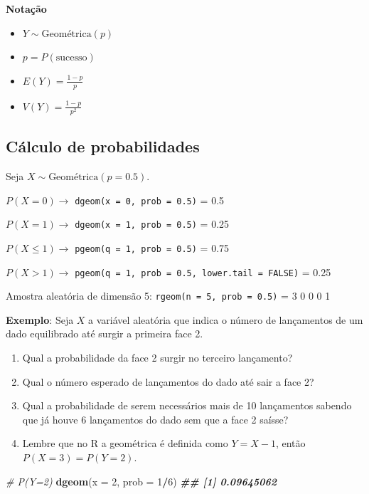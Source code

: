 \documentclass[
]{book}
\newenvironment{Shaded}{\begin{snugshade}}{\end{snugshade}}
\newcommand{\AttributeTok}[1]{\textcolor[rgb]{0.13,0.29,0.53}{#1}}
\newcommand{\CommentTok}[1]{\textcolor[rgb]{0.56,0.35,0.01}{\textit{#1}}}
\newcommand{\DecValTok}[1]{\textcolor[rgb]{0.00,0.00,0.81}{#1}}
\newcommand{\DocumentationTok}[1]{\textcolor[rgb]{0.56,0.35,0.01}{\textbf{\textit{#1}}}}
\newcommand{\FunctionTok}[1]{\textcolor[rgb]{0.13,0.29,0.53}{\textbf{#1}}}
\newcommand{\NormalTok}[1]{#1}
\newcommand{\SpecialCharTok}[1]{\textcolor[rgb]{0.81,0.36,0.00}{\textbf{#1}}}
\providecommand{\tightlist}{%
  \setlength{\itemsep}{0pt}\setlength{\parskip}{0pt}}
\begin{document}
\textbf{Notação}

\begin{itemize}
\tightlist
\item
  \(Y \sim \text{Geométrica}(p)\)
\item
  \(p = P(\text{sucesso})\)
\item
  \(E(Y) = \frac{1-p}{p}\)
\item
  \(V(Y) = \frac{1-p}{p^2}\)
\end{itemize}

\subsection{Cálculo de probabilidades}\label{cuxe1lculo-de-probabilidades-2}

Seja \(X\sim \text{Geométrica}(p=0.5)\).

\(P(X=0) \to\) \texttt{dgeom(x\ =\ 0,\ prob\ =\ 0.5)} = 0.5

\(P(X=1) \to\) \texttt{dgeom(x\ =\ 1,\ prob\ =\ 0.5)} = 0.25

\(P(X \leq 1) \to\) \texttt{pgeom(q\ =\ 1,\ prob\ =\ 0.5)} = 0.75

\(P(X > 1) \to\) \texttt{pgeom(q\ =\ 1,\ prob\ =\ 0.5,\ lower.tail\ =\ FALSE)} = 0.25

Amostra aleatória de dimensão 5: \texttt{rgeom(n\ =\ 5,\ prob\ =\ 0.5)} = 3 0 0 0 1

\textbf{Exemplo}: Seja \(X\) a variável aleatória que indica o número de lançamentos de um dado equilibrado até surgir a primeira face 2.

\begin{enumerate}
\def\labelenumi{(\alph{enumi})}
\item
  Qual a probabilidade da face 2 surgir no terceiro lançamento?
\item
  Qual o número esperado de lançamentos do dado até sair a face 2?
\item
  Qual a probabilidade de serem necessários mais de 10 lançamentos sabendo que já houve 6 lançamentos do dado sem que a face 2 saísse?
\item
  Lembre que no R a geométrica é definida como \(Y = X-1\), então \(P(X=3)=P(Y=2)\).
\end{enumerate}

\begin{Shaded}
\begin{Highlighting}[]
\CommentTok{\# P(Y=2)}
\FunctionTok{dgeom}\NormalTok{(}\AttributeTok{x =} \DecValTok{2}\NormalTok{, }\AttributeTok{prob =} \DecValTok{1}\SpecialCharTok{/}\DecValTok{6}\NormalTok{)}
\DocumentationTok{\#\# [1] 0.09645062}
\end{Highlighting}
\end{Shaded}
\end{document}
